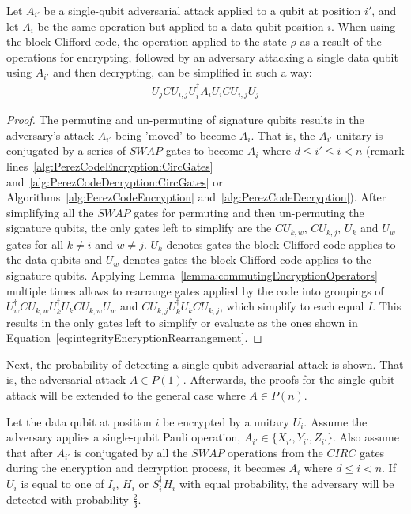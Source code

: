 \begin{myLemmarep}
\label{lemma:integrityEncryptionRearrangement}
Let $A_{i'}$ be a single-qubit adversarial attack applied to a qubit at position $i'$, and let $A_i$ be the same operation but applied to a data qubit position $i$. When using the block Clifford code, the operation applied to the state $\rho$ as a result of the operations for encrypting, followed by an adversary attacking a single data qubit using $A_{i'}$ and then decrypting, can be simplified in such a way:
\begin{align}
U_{j} \mathit{CU}_{i,j}U_i^{\dagger}A_{i}U_i\mathit{CU}_{i,j} U_{j} \label{eq:integrityEncryptionRearrangement}
\end{align}
\end{myLemmarep}
\begin{proof}
The permuting and un-permuting of signature qubits results in the adversary's attack $A_{i'}$ being 'moved' to become $A_i$. That is, the $A_{i'}$ unitary is conjugated by a series of $\mathit{SWAP}$ gates to become $A_{i}$ where $d \leq i' \leq i < n$ (remark lines~\ref{alg:PerezCodeEncryption:CircGates} and~\ref{alg:PerezCodeDecryption:CircGates} or Algorithms~\ref{alg:PerezCodeEncryption} and~\ref{alg:PerezCodeDecryption}). After simplifying all the $\mathit{SWAP}$ gates for permuting and then un-permuting the signature qubits, the only gates left to simplify are the $\mathit{CU}_{k,w}$, $\mathit{CU}_{k,j}$, $U_k$ and $U_w$ gates for all $k \neq i$ and $w \neq j$. $U_k$ denotes gates the block Clifford code applies to the data qubits and $U_w$ denotes gates the block Clifford code applies to the signature qubits. Applying Lemma~\ref{lemma:commutingEncryptionOperators} multiple times allows to rearrange gates applied by the code into groupings of  $U_w^{\dagger}\mathit{CU}_{k,w}U_k^{\dagger}U_k\mathit{CU}_{k,w}U_w$ and $\mathit{CU}_{k,j}U_k^{\dagger}U_k\mathit{CU}_{k,j}$, which simplify to each equal $I$. This results in the only gates left to simplify or evaluate as the ones shown in Equation~\eqref{eq:integrityEncryptionRearrangement}.
\end{proof}
Next, the probability of detecting a single-qubit adversarial attack is shown. That is, the adversarial attack $A \in {P(1)}$. Afterwards, the proofs for the single-qubit attack will be extended to the general case where $A \in P(n)$.
\begin{theorem}
\label{theorem:singleQubitAttackOnDataQubit}
Let the data qubit at position $i$ be encrypted by a unitary $U_i$. Assume the adversary applies a single-qubit Pauli operation, $A_{i'} \in \{X_{i'}, Y_{i'}, Z_{i'}\}$. Also assume that after $A_{i'}$ is conjugated by all the $\mathit{SWAP}$ operations from the $\mathit{CIRC}$ gates during the encryption and decryption process, it becomes $A_i$ where $d \leq i < n$. If $U_i$ is equal to one of $I_i$, $H_i$ or $S_i^{\dagger}H_i$ with equal probability, the adversary will be detected with probability $\frac{2}{3}$.
\end{theorem}
